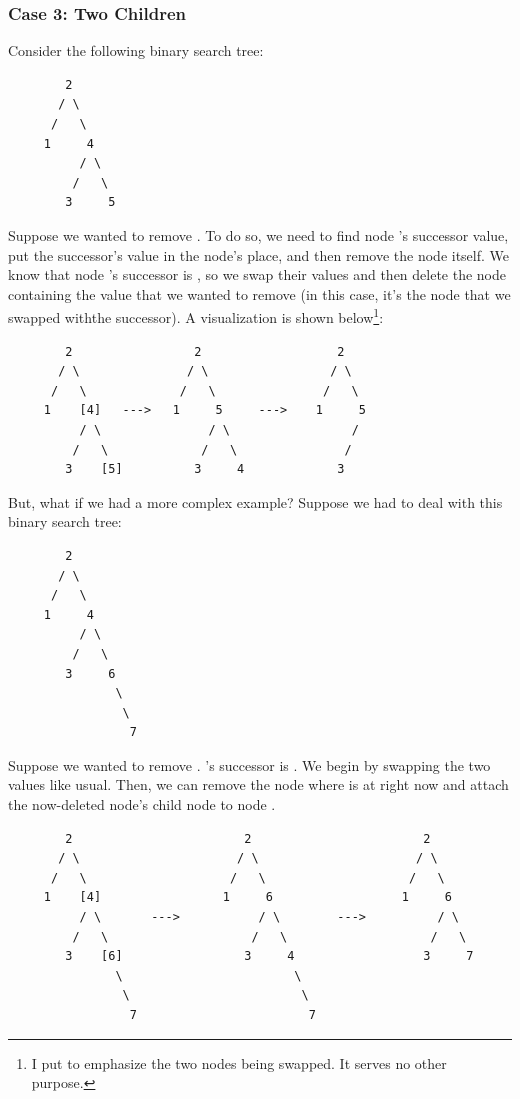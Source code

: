 \documentclass[letterpaper]{article}
\begin{document}
\subsubsection{Case 3: Two Children}
Consider the following binary search tree: 
\begin{verbatim}
        2 
       / \ 
      /   \ 
     1     4 
          / \ 
         /   \ 
        3     5
\end{verbatim}
Suppose we wanted to remove . To do so, we need to find node 's successor value, put the successor's value in the node's place, and then remove the node itself. We know that node 's successor is , so we swap their values and then delete the node containing the value that we wanted to remove (in this case, it's the node that we swapped withthe successor). A visualization is shown below\footnote{I put \code{[]} to emphasize the two nodes being swapped. It serves no other purpose.}:
\begin{verbatim}
        2                 2                   2                   
       / \               / \                 / \                  
      /   \             /   \               /   \ 
     1    [4]   --->   1     5     --->    1     5 
          / \               / \                 / 
         /   \             /   \               /
        3    [5]          3     4             3
\end{verbatim}


But, what if we had a more complex example? Suppose we had to deal with this binary search tree: 
\begin{verbatim}
        2
       / \ 
      /   \ 
     1     4 
          / \  
         /   \ 
        3     6
               \ 
                \ 
                 7
\end{verbatim}
Suppose we wanted to remove . 's successor is . We begin by swapping the two values like usual. Then, we can remove the node where  is at right now and attach the now-deleted node's child node to node .  
\begin{verbatim}
        2                        2                        2
       / \                      / \                      / \ 
      /   \                    /   \                    /   \  
     1    [4]                 1     6                  1     6 
          / \       --->           / \        --->          / \  
         /   \                    /   \                    /   \ 
        3    [6]                 3     4                  3     7
               \                        \                         
                \                        \                         
                 7                        7
\end{verbatim}
\end{document}
